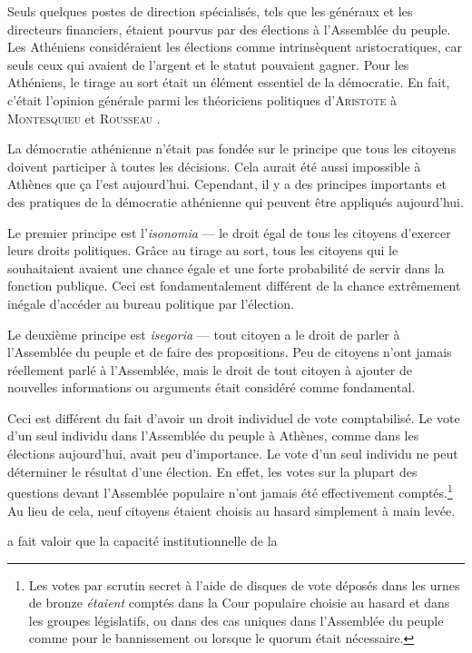 Seuls quelques postes de direction spécialisés, tels que les généraux
et les directeurs financiers, étaient pourvus par des élections à
l'Assemblée du peuple. Les Athéniens considéraient les élections comme
intrinsèquent aristocratiques, car seuls ceux qui avaient de l'argent
et le statut pouvaient gagner. Pour les Athéniens, le tirage au sort
était un élément essentiel de la démocratie. En fait, c'était l'opinion
générale parmi les théoriciens politiques d'\textsc{Aristote} à
\textsc{Montesquieu} et \textsc{Rousseau} \cite{manin97}.\par
La démocratie athénienne n'était pas fondée sur le principe que tous
les citoyens doivent participer à toutes les décisions. Cela aurait
été aussi impossible à Athènes que ça l'est aujourd'hui. Cependant, il
y a des principes importants et des pratiques de la démocratie
athénienne qui peuvent être appliqués aujourd'hui.\par
Le premier principe est l'\emph{isonomia} --- le droit égal de tous les
citoyens d'exercer leurs droits politiques. Grâce au tirage au sort,
tous les citoyens qui le souhaitaient avaient une chance égale et une
forte probabilité de servir dans la fonction publique. Ceci est
fondamentalement différent de la chance extrêmement inégale d'accéder
au bureau politique par l'élection.\par
Le deuxième principe est \emph{isegoria} --- tout citoyen a le droit
de parler à l'Assemblée du peuple et de faire des propositions. Peu de
citoyens n'ont jamais réellement parlé à l'Assemblée, mais le droit de
tout citoyen à ajouter de nouvelles informations ou arguments était
considéré comme fondamental.\par 
Ceci est différent du fait d'avoir un droit individuel de vote
comptabilisé. Le vote d'un seul individu dans l'Assemblée du peuple à
Athènes, comme dans les élections aujourd'hui, avait peu
d'importance. Le vote d'un seul individu ne peut déterminer le
résultat d'une élection. En effet, les votes sur la plupart des
questions devant l'Assemblée populaire n'ont jamais été effectivement
comptés.\footnote{%
  Les votes par scrutin secret à l'aide de disques de
  vote déposés dans les urnes de bronze \emph{étaient} comptés dans la
  Cour populaire choisie au hasard et dans les groupes législatifs, ou
  dans des cas uniques dans l'Assemblée du peuple comme pour le
  bannissement ou lorsque le quorum était nécessaire.%
} Au lieu de
cela, neuf citoyens étaient choisis au hasard simplement à main
levée.\par 
\cite{ober08} a fait valoir que la capacité institutionnelle de la
